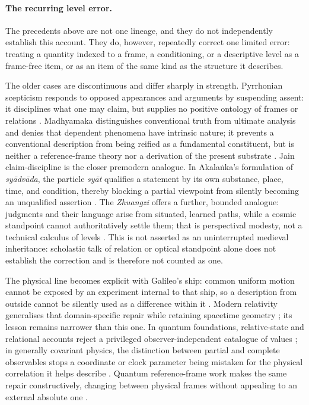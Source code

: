 \documentclass[11pt,a4paper]{article}
\theoremstyle{remark}\newtheorem{remark}[definition]{Remark}
\begin{document}
\paragraph{The recurring level error.} The precedents above are not one lineage, and they do not independently establish this account. They do, however, repeatedly correct one limited error: treating a quantity indexed to a frame, a conditioning, or a descriptive level as a frame-free item, or as an item of the same kind as the structure it describes.

The older cases are discontinuous and differ sharply in strength. Pyrrhonian scepticism responds to opposed appearances and arguments by suspending assent: it disciplines what one may claim, but supplies no positive ontology of frames or relations \citep{sextus2000}. Madhyamaka distinguishes conventional truth from ultimate analysis and denies that dependent phenomena have intrinsic nature; it prevents a conventional description from being reified as a fundamental constituent, but is neither a reference-frame theory nor a derivation of the present substrate \citep{nagarjuna1995}. Jain claim-discipline is the closer premodern analogue. In Akala\.nka's formulation of \emph{sy\=adv\=ada}, the particle \emph{sy\=at} qualifies a statement by its own substance, place, time, and condition, thereby blocking a partial viewpoint from silently becoming an unqualified assertion \citep{nahata2024}. The \emph{Zhuangzi} offers a further, bounded analogue: judgments and their language arise from situated, learned paths, while a cosmic standpoint cannot authoritatively settle them; that is perspectival modesty, not a technical calculus of levels \citep{zhuangzi1968}. This is not asserted as an uninterrupted medieval inheritance: scholastic talk of relation or optical standpoint alone does not establish the correction and is therefore not counted as one.

The physical line becomes explicit with Galileo's ship: common uniform motion cannot be exposed by an experiment internal to that ship, so a description from outside cannot be silently used as a difference within it \citep{galilei1967}. Modern relativity generalises that domain-specific repair while retaining spacetime geometry \citep{einstein1916}; its lesson remains narrower than this one. In quantum foundations, relative-state and relational accounts reject a privileged observer-independent catalogue of values \citep{everett1957,rovelli1996}; in generally covariant physics, the distinction between partial and complete observables stops a coordinate or clock parameter being mistaken for the physical correlation it helps describe \citep{pagewootters1983,rovelli2002}. Quantum reference-frame work makes the same repair constructively, changing between physical frames without appealing to an external absolute one \citep{giacomini2019}.
\end{document}
